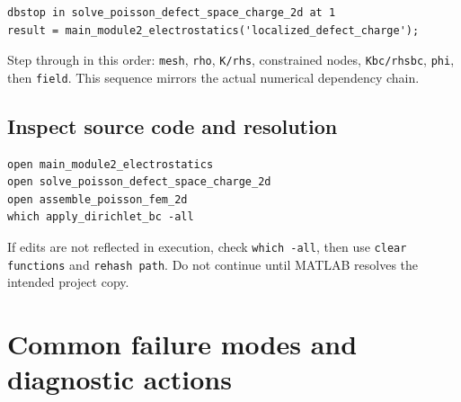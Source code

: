 \documentclass[11pt]{article}
\begin{document}
\begin{lstlisting}[style=projectmatlab]
dbstop in solve_poisson_defect_space_charge_2d at 1
result = main_module2_electrostatics('localized_defect_charge');
\end{lstlisting}
Step through in this order: \texttt{mesh}, \texttt{rho}, \texttt{K/rhs}, constrained nodes, \texttt{Kbc/rhsbc}, \texttt{phi}, then \texttt{field}. This sequence mirrors the actual numerical dependency chain.

\subsection{Inspect source code and resolution}

\begin{lstlisting}[style=projectmatlab]
open main_module2_electrostatics
open solve_poisson_defect_space_charge_2d
open assemble_poisson_fem_2d
which apply_dirichlet_bc -all
\end{lstlisting}
If edits are not reflected in execution, check \texttt{which -all}, then use \texttt{clear functions} and \texttt{rehash path}. Do not continue until MATLAB resolves the intended project copy.

\section{Common failure modes and diagnostic actions}
\end{document}
